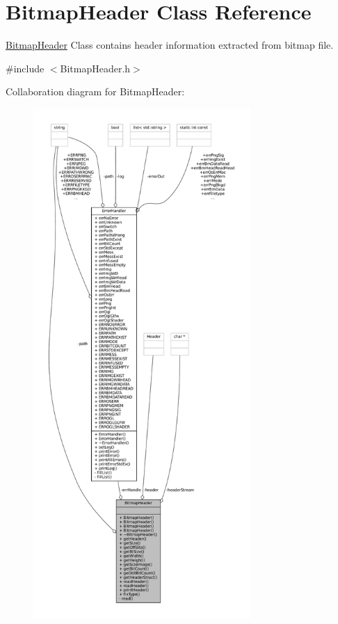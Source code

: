 \hypertarget{classBitmapHeader}{}\section{Bitmap\+Header Class Reference}
\label{classBitmapHeader}


\mbox{\hyperlink{classBitmapHeader}{Bitmap\+Header}} Class contains header information extracted from bitmap file.  




{\ttfamily \#include $<$Bitmap\+Header.\+h$>$}



Collaboration diagram for Bitmap\+Header\+:\nopagebreak
\begin{figure}[H]
\begin{center}
\leavevmode
\includegraphics[height=550pt]{classBitmapHeader__coll__graph}
\end{center}
\end{figure}
